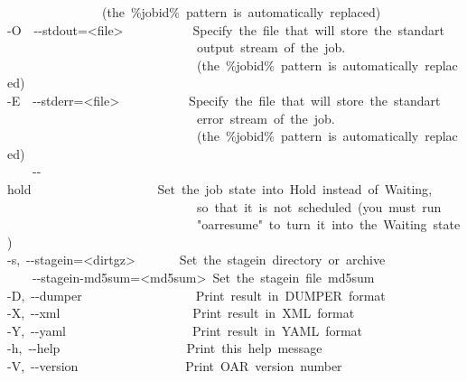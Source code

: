 {{~~~~~~~~~~~~~~~(the~{\%}jobid{\%}~pattern~is~automatically~replaced)\mbox{}\\{\mbox{-}}O~~{\mbox{-}}{\mbox{-}}stdout={\textless}file{\textgreater}~~~~~~~~~~~Specify~the~file~that~will~store~the~standart\mbox{}\\~~~~~~~~~~~~~~~~~~~~~~~~~~~~~~output~stream~of~the~job.\mbox{}\\~~~~~~~~~~~~~~~~~~~~~~~~~~~~~~(the~{\%}jobid{\%}~pattern~is~automatically~replaced)\mbox{}\\{\mbox{-}}E~~{\mbox{-}}{\mbox{-}}stderr={\textless}file{\textgreater}~~~~~~~~~~~Specify~the~file~that~will~store~the~standart\mbox{}\\~~~~~~~~~~~~~~~~~~~~~~~~~~~~~~error~stream~of~the~job.\mbox{}\\~~~~~~~~~~~~~~~~~~~~~~~~~~~~~~(the~{\%}jobid{\%}~pattern~is~automatically~replaced)\mbox{}\\~~~~{\mbox{-}}{\mbox{-}}hold~~~~~~~~~~~~~~~~~~~~Set~the~job~state~into~Hold~instead~of~Waiting{,}\mbox{}\\~~~~~~~~~~~~~~~~~~~~~~~~~~~~~~so~that~it~is~not~scheduled~(you~must~run\mbox{}\\~~~~~~~~~~~~~~~~~~~~~~~~~~~~~~{"}oarresume{"}~to~turn~it~into~the~Waiting~state)\mbox{}\\{\mbox{-}}s{,}~{\mbox{-}}{\mbox{-}}stagein={\textless}dir{\textbar}tgz{\textgreater}~~~~~~~Set~the~stagein~directory~or~archive\mbox{}\\~~~~{\mbox{-}}{\mbox{-}}stagein{\mbox{-}}md5sum={\textless}md5sum{\textgreater}~Set~the~stagein~file~md5sum\mbox{}\\{\mbox{-}}D{,}~{\mbox{-}}{\mbox{-}}dumper~~~~~~~~~~~~~~~~~~Print~result~in~DUMPER~format\mbox{}\\{\mbox{-}}X{,}~{\mbox{-}}{\mbox{-}}xml~~~~~~~~~~~~~~~~~~~~~Print~result~in~XML~format\mbox{}\\{\mbox{-}}Y{,}~{\mbox{-}}{\mbox{-}}yaml~~~~~~~~~~~~~~~~~~~~Print~result~in~YAML~format\mbox{}\\{\mbox{-}}h{,}~{\mbox{-}}{\mbox{-}}help~~~~~~~~~~~~~~~~~~~~Print~this~help~message\mbox{}\\{\mbox{-}}V{,}~{\mbox{-}}{\mbox{-}}version~~~~~~~~~~~~~~~~~Print~OAR~version~number%
        }}%
        \Dauxiliaryspace%
        \renewcommand{\Dparagraphindented}{true}%
        \renewcommand{\Dparent}{section}%
